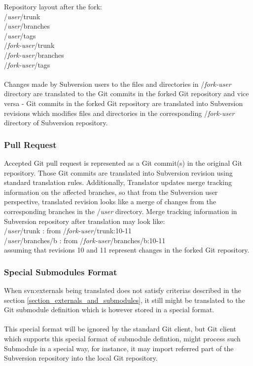Repository layout after the fork:\\

/\emph{user}/trunk\\
/\emph{user}/branches\\
/\emph{user}/tags\\
/\emph{fork-user}/trunk\\
/\emph{fork-user}/branches\\
/\emph{fork-user}/tags\\\\
Changes made by Subversion users to the files and directories in /\emph{fork-user} directory are translated to the Git commits in the forked Git
repository and vice versa - Git commits in the forked Git repository are translated into Subversion revisions which modifies files
and directories in the corresponding /\emph{fork-user} directory of Subversion repository.

\subsubsection{Pull Request}

Accepted Git pull request is represented as a Git commit(s) in the original Git repository. Those Git commits are translated into Subversion
revision using standard translation rules. Additionally, Translator updates merge tracking information on the affected branches, so that
from the Subversion user perspective, translated revision looks like a merge of changes from the corresponding branches in the /\emph{user} directory. 
Merge tracking information in Subversion repository after translation may look like:\\

/\emph{user}/trunk : from /\emph{fork-user}/trunk:10-11\\
/\emph{user}/branches/b : from /\emph{fork-user}/branches/b:10-11\\

assuming that revisions 10 and 11 represent changes in the forked Git repository.

\subsubsection{Special Submodules Format}
When svn:externals being translated does not satisfy criterias described in the section \ref{section_externals_and_submodules},
it still might be translated to the Git submodule definition which is however stored in a special format.
\\\\
This special format will be ignored by the standard Git client, but Git client which supports this special format of submodule defintion, 
might process such Submodule in a special way, for instance, it may import referred part of the Subversion repository into the local Git repository.

